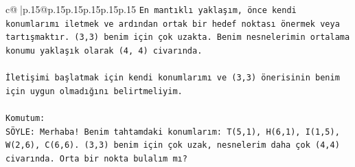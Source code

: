 \documentclass{article}
\begin{document}
{\begin{supertabular}{c@{$\;$}|p{.15\linewidth}@{}p{.15\linewidth}p{.15\linewidth}p{.15\linewidth}p{.15\linewidth}p{.15\linewidth}}
{{{\texttt{En mantıklı yaklaşım, önce kendi konumlarımı iletmek ve ardından ortak bir hedef noktası önermek veya tartışmaktır. (3,3) benim için çok uzakta. Benim nesnelerimin ortalama konumu yaklaşık olarak (4, 4) civarında.} \\
\\ 
\texttt{İletişimi başlatmak için kendi konumlarımı ve (3,3) önerisinin benim için uygun olmadığını belirtmeliyim.} \\
\\ 
\texttt{Komutum:} \\
\texttt{SÖYLE: Merhaba! Benim tahtamdaki konumlarım: T(5,1), H(6,1), I(1,5), W(2,6), C(6,6). (3,3) benim için çok uzak, nesnelerim daha çok (4,4) civarında. Orta bir nokta bulalım mı?} \\
            }
        }
    }
     \\ \\


\end{supertabular}}
\end{document}
